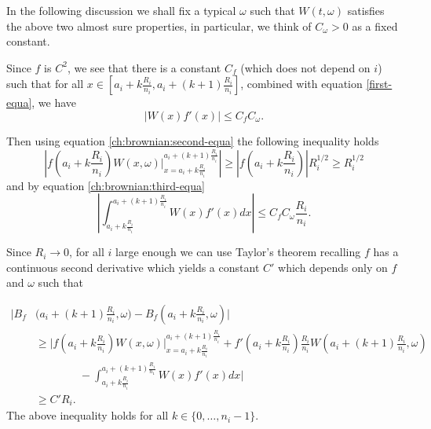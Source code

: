 	In the following discussion we shall fix a typical $\omega$ such that $W(t,\omega)$ satisfies the above two almost sure properties, in particular, we think of $C_\omega>0$ as a fixed constant. 
	
	Since $f$ is $C^2$, we see that there is a constant $C_f$ (which does not depend on $i$) such that for all $x\in \left[{a_i+k\frac{R_i}{n_i}},{a_i+(k+1)\frac{R_i}{n_i}}\right]$, combined with equation \eqref{first-equa}, we have
	\begin{equation}
	\lvert W(x)f'(x)\rvert \leq C_f C_\omega. \label{ch:brownian:third-equa}
	\end{equation}
	
	Then using equation \eqref{ch:brownian:second-equa} the following inequality holds
	\begin{equation}
	\left| f\left(a_i+k\frac{R_i}{n_i}\right)W(x,\omega)\bigg\vert_{x=a_i+k\frac{R_i}{n_i}}^{a_i+(k+1)\frac{R_i}{n_i}} \right| \geq \left| f\left(a_i+k\frac{R_i}{n_i}\right) \right| R_i^{1/2}\geq R_i^{1/2}\label{ch:brownian:ineq-one}    
	\end{equation}
	and by equation \eqref{ch:brownian:third-equa}
	\[
	\left\vert\int_{a_i+k\frac{R_i}{n_i}}^{a_i+(k+1)\frac{R_i}{n_i}} W(x)f'(x)dx \right\vert\leq C_fC_\omega\frac{R_i}{n_i}.
	\]
	
	Since $R_i\to 0$, for all $i$ large enough we can use Taylor's theorem recalling $f$ has a continuous second derivative which yields a constant $C'$ which depends only on $f$ and $\omega$ such that
	
	\begin{align}\label{ch:brownian:main-equa}
	    \bigg\vert B_f&\bigg(a_i+(k+1)\frac{R_i}{n_i},\omega\bigg)-B_f\left(a_i+k\frac{R_i}{n_i},\omega\right)\bigg\vert \\
	    &\ge \bigg\vert f\left(a_i + k \frac{R_i}{n_i}\right) W(x,\omega) \bigg\vert_{x=a_i+k\frac{R_i}{n_i}}^{a_i+(k+1)\frac{R_i}{n_i}} + f'\left(a_i + k\frac{R_i}{n_i}\right) \frac{R_i}{n_i} W\left(a_i +(k+1) \frac{R_i}{n_i},\omega\right) \nonumber\\ 
	    &\qquad \qquad- \int_{a_i+k \frac{R_i}{n_i}}^{a_i+(k+1)\frac{R_i}{n_1}}W(x)f'(x)dx \bigg\vert  \nonumber \\
	    & \ge C'R_i. \nonumber
	\end{align}
	The above inequality holds for all $k\in\{0,\dots,n_i-1\}$. 
	
